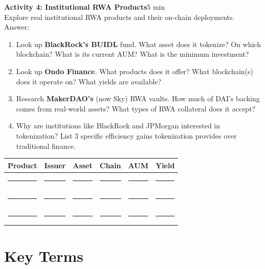 \documentclass[11pt,a4paper]{article}
\newcommand{\activitybox}[3]{%
  \noindent\colorbox{mllavender4}{\parbox{\dimexpr\linewidth-2\fboxsep}{%
    \textbf{\color{mlpurple}#1}\hfill\textcolor{mlgray}{\small #2}\\[2pt]#3%
  }}\par\vspace{4pt}%
}
\newcommand{\fillcell}{\rule{2.2cm}{0.3pt}}
\begin{document}
\activitybox{Activity 4: Institutional RWA Products}{5 min}{%
Explore real institutional RWA products and their on-chain deployments. Answer:
\begin{enumerate}
\item Look up \textbf{BlackRock's BUIDL} fund. What asset does it tokenize? On which blockchain? What is its current AUM? What is the minimum investment?
\item Look up \textbf{Ondo Finance}. What products does it offer? What blockchain(s) does it operate on? What yields are available?
\item Research \textbf{MakerDAO's} (now Sky) RWA vaults. How much of DAI's backing comes from real-world assets? What types of RWA collateral does it accept?
\item Why are institutions like BlackRock and JPMorgan interested in tokenization? List 3 specific efficiency gains tokenization provides over traditional finance.
\end{enumerate}
\vspace{4pt}
{\footnotesize\renewcommand{\arraystretch}{1.35}%
\setlength{\tabcolsep}{5pt}%
\begin{tabular}{@{}llllll@{}}
\toprule
\textbf{Product} & \textbf{Issuer} & \textbf{Asset} & \textbf{Chain} & \textbf{AUM} & \textbf{Yield} \\
\midrule
\fillcell & \fillcell & \fillcell & \fillcell & \fillcell & \fillcell \\
\fillcell & \fillcell & \fillcell & \fillcell & \fillcell & \fillcell \\
\fillcell & \fillcell & \fillcell & \fillcell & \fillcell & \fillcell \\
\bottomrule
\end{tabular}}
\vspace{2pt}
}

\vspace{4pt}

\section{Key Terms}
\end{document}
